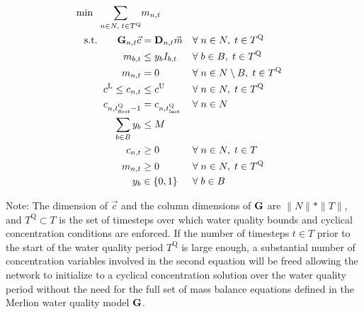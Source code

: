 \begin{align}
\min \;\; \sum_{n\in N,\; t\in T^{\text{Q}}} & m_{n,t} \\
{\rm s.t.}\qquad \bold{G}_{n,t}\vec{c} &= \bold{D}_{n,t}\vec{m} &&\forall \; n \in N,\; t \in T^{\text{Q}} \label{mass_balance} \\
m_{b,t} &\leq y_{b}I_{b,t} &&\forall \; b\in B,\; t\in T^{\text{Q}} \\
m_{n,t} &= 0 &&\forall \; n\in N\setminus B,\; t\in T^{\text{Q}} \\
c^{\text{L}} \leq c_{n,t}& \leq c^{\text{U}} &&\forall \; n\in N,\; t\in T^{\text{Q}} \\
c_{n,t^{\text{Q}}_{\text{first}}-1} &= c_{n,t^{\text{Q}}_{\text{last}}} &&\forall \; n\in N \\
\sum_{b\in B}y_{b} &\leq M \\
c_{n,t}&\geq 0&&\forall \; n\in N,\; t\in T \\
m_{n,t}&\geq 0&&\forall \; n\in N,\; t\in T^{\text{Q}} \\
y_{b} &\in \{0,1\} &&\forall \; b\in B 
\end{align}

Note:
The dimension of $\vec{c}$ and the column dimensions of $\bold{G}$ are $\|N\|*\|T\|$, and $T^{\text{Q}} \subset T$ is the set of timesteps over which water quality bounds and cyclical concentration conditions are enforced. If the number of timesteps $t\in T$ prior to the start of the water quality period $T^{\text{Q}}$ is large enough, a substantial number of concentration variables involved in the second equation will be freed allowing the network to initialize to a cyclical concentration solution over the water quality period without the need for the full set of mass balance equations defined in the Merlion water quality model $\bold{G}$.

